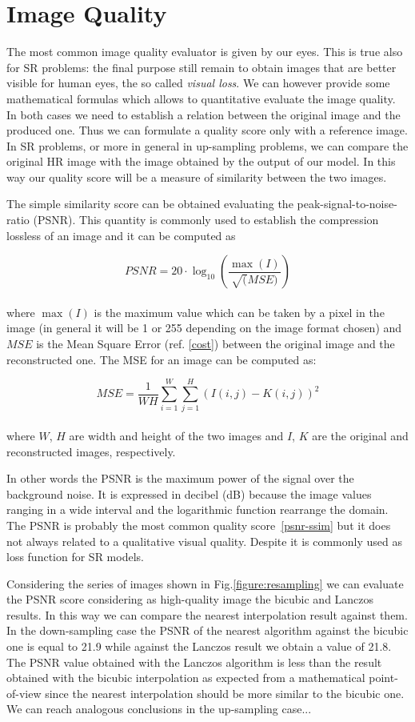 \documentclass{standalone}
\begin{document}
\section[Image Quality]{Image Quality}\label{quality}

The most common image quality evaluator is given by our eyes.
This is true also for SR problems: the final purpose still remain to obtain images that are better visible for human eyes, the so called \emph{visual loss}.
We can however provide some mathematical formulas which allows to quantitative evaluate the image quality.
In both cases we need to establish a relation between the original image and the produced one.
Thus we can formulate a quality score only with a reference image.
In SR problems, or more in general in up-sampling problems, we can compare the original HR image with the image obtained by the output of our model.
In this way our quality score will be a measure of similarity between the two images.

The simple similarity score can be obtained evaluating the peak-signal-to-noise-ratio (PSNR).
This quantity is commonly used to establish the compression lossless of an image and it can be computed as

$$
PSNR = 20 \cdot \log_{10}\left( \frac{\max(I)}{\sqrt(MSE)} \right)
$$
\\
where $\max(I)$ is the maximum value which can be taken by a pixel in the image (in general it will be 1 or 255 depending on the image format chosen) and $MSE$ is the Mean Square Error (ref. \ref{cost}) between the original image and the reconstructed one.
The MSE for an image can be computed as:

$$
MSE = \frac{1}{WH} \sum_{i=1}^{W}\sum_{j=1}^{H} \left( I(i, j) - K(i, j) \right)^2
$$
\\
where $W$, $H$ are width and height of the two images and $I$, $K$ are the original and reconstructed images, respectively.

In other words the PSNR is the maximum power of the signal over the background noise.
It is expressed in decibel (dB) because the image values ranging in a wide interval and the logarithmic function rearrange the domain.
The PSNR is probably the most common quality score~\ref{psnr-ssim} but it does not always related to a qualitative visual quality.
Despite it is commonly used as loss function for SR models.

Considering the series of images shown in Fig.\ref{figure:resampling} we can evaluate the PSNR score considering as high-quality image the bicubic and Lanczos results.
In this way we can compare the nearest interpolation result against them.
In the down-sampling case the PSNR of the nearest algorithm against the bicubic one is equal to 21.9 while against the Lanczos result we obtain a value of 21.8.
The PSNR value obtained with the Lanczos algorithm is less than the result obtained with the bicubic interpolation as expected from a mathematical point-of-view since the nearest interpolation should be more similar to the bicubic one.
We can reach analogous conclusions in the up-sampling case...
\end{document}
